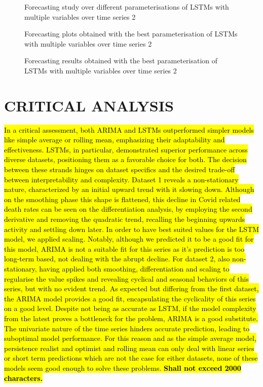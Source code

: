 \documentclass[10pt]{extarticle}
\newcommand{\ctext}[3][RGB]{%
  \begingroup
  \definecolor{hlcolor}{#1}{#2}\sethlcolor{hlcolor}%
  \hl{#3}%
  \endgroup
}
\begin{document}
\begin{figure}[H]
\caption{Forecasting study over different parameterisations of LSTMs with multiple variables over time series 2}
\end{figure}

\begin{figure}[H]
\caption{Forecasting plots obtained with the best parameterisation of LSTMs with multiple variables over time series 2}
\end{figure}

\begin{figure}[H]
\caption{Forecasting results obtained with the best parameterisation of LSTMs with multiple variables over time series 2}
\end{figure}

\section{CRITICAL ANALYSIS}
\ctext[RGB]{190,190,190}{In a critical assessment, both ARIMA and LSTMs outperformed simpler models like simple average or rolling mean, emphasizing their adaptability and effectiveness. LSTMs, in particular, demonstrated superior performance across diverse datasets, positioning them as a favorable choice for both. The decision between these strands hinges on dataset specifics and the desired trade-off between interpretability and complexity.
Dataset 1 reveals a non-stationary nature, characterized by an initial upward trend with it slowing down. Although on the smoothing phase this shape is flattened, this decline in Covid related death rates can be seen on the differentiation analysis, by employing the second derivative and removing the quadratic trend, recalling the beginning upwards activity and settling down later. In order to have best suited values for the LSTM model, we applied scaling.  Notably, although we predicted it to be a good fit for this model, ARIMA is not a suitable fit for this series as it's prediction is too long-term based, not dealing with the abrupt decline.
For dataset 2, also non-stationary, having applied both smoothing, differentiation and scaling to regularise the value spikes and revealing cyclical and seasonal behaviors of this series, but with no evident trend. As expected but differing from the first dataset, the ARIMA model provides a good fit, encapsulating the cyclicality of this series on a good level. Despite not being as accurate as LSTM, if the model complexity from the latest proves a bottleneck for the problem, ARIMA is a good substitute.
The univariate nature of the time series hinders accurate prediction, leading to suboptimal model performance. For this reason and as the simple average model, persistence realist and optimist and rolling mean can only deal with linear series or short term predictions which are not the case for either datasets, none of these models seem good enough to solve these problems. \textbf{Shall not exceed 2000 characters.}}
\end{document}
